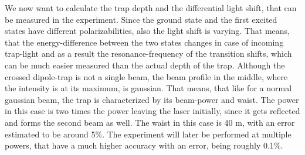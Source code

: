 We now want to calculate the trap depth and the differential light shift, that can be measured in the experiment. Since the ground state and the first excited states have different polarizabilities, also the light shift is varying. That means, that the energy-difference between the two states changes in case of incoming trap-light and as a result the resonance-frequency of the transition shifts, which can be much easier measured than the actual depth of the trap. Although the crossed dipole-trap is not a single beam, the beam profile in the middle, where the intensity is at its maximum, is gaussian. That means, that like for a normal gaussian beam, the trap is characterized by its beam-power and waist. The power in this case is two times the power leaving the laser initially, since it gets reflected and forms the second beam as well. The waist in this case is 40 \mu m, with an error estimated to be around 5\%. The experiment will later be performed at multiple powers, that have a much higher accuracy with an error, being roughly 0.1\%.
